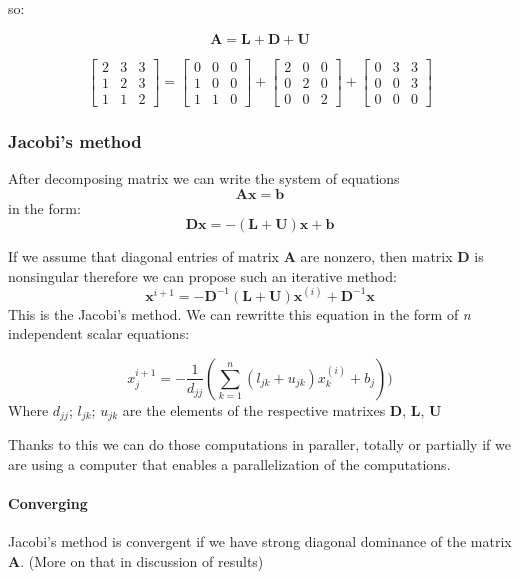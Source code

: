 so:

\[ \mathbf{A} = \mathbf{L} + \mathbf{D} + \mathbf{U} \]

\[
\begin{bmatrix}
2 & 3 & 3\\
1 & 2 & 3\\
1 & 1 & 2
\end{bmatrix}
=
\begin{bmatrix}
0 & 0 & 0\\
1 & 0 & 0\\
1 & 1 & 0
\end{bmatrix}
+
\begin{bmatrix}
2 & 0 & 0\\
0 & 2 & 0\\
0 & 0 & 2
\end{bmatrix}
+
\begin{bmatrix}
0 & 3 & 3\\
0 & 0 & 3\\
0 & 0 & 0
\end{bmatrix}
\]

\subsubsection{Jacobi's method}
After decomposing matrix we can write the system of equations
\[ \mathbf{A}\mathbf{x} = \mathbf{b} \]
in the form:
\[ \mathbf{D}\mathbf{x} = -(\mathbf{L}+\mathbf{U})\mathbf{x}+\mathbf{b}
\]

If we assume that diagonal entries of matrix \textbf{A} are nonzero, then matrix \textbf{D} is nonsingular therefore we can propose such an iterative method:
\[ \mathbf{x}^{i+1} = -\mathbf{D}^{-1}(\mathbf{L}+\mathbf{U})\mathbf{x}^{(i)}+\mathbf{D}^{-1}\mathbf{x}
\]
This is the Jacobi's method.
We can rewritte this equation in the form of \textit{n} independent scalar equations:

\[
{x}_j^{i+1} = -\frac{1}{d_{jj}}(
\sum^n_{k=1} (l_{jk} + u_{jk})x_k^{(i)}+b_j)
) \]
Where $d_{jj}$; $l_{jk}$;  $u_{jk}$ are the elements of the respective matrixes \textbf{D}, \textbf{L}, \textbf{U}

Thanks to this we can do those computations in paraller, totally or partially if we are using a computer that enables a parallelization of the computations.

\paragraph{Converging}
Jacobi's method is convergent if we have strong diagonal dominance of the matrix \textbf{A}. (More on that in discussion of results)


